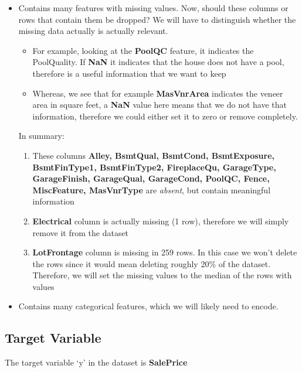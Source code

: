 \documentclass[11pt]{article}
\providecommand{\tightlist}{%
      \setlength{\itemsep}{0pt}\setlength{\parskip}{0pt}}
\begin{document}
\begin{itemize}
\tightlist
\item
  Contains many features with missing values. Now, should these columns
  or rows that contain them be dropped? We will have to distinguish
  whether the missing data actually is actually relevant.

  \begin{itemize}
  \tightlist
  \item
    For example, looking at the \textbf{PoolQC} feature, it indicates
    the PoolQuality. If \textbf{NaN} it indicates that the house does
    not have a pool, therefore is a useful information that we want to
    keep
  \item
    Whereas, we see that for example \textbf{MasVnrArea} indicates the
    veneer area in square feet, a \textbf{NaN} value here means that we
    do not have that information, therefore we could either set it to
    zero or remove completely.
  \end{itemize}

  In summary:

  \begin{enumerate}
  \def\labelenumi{\arabic{enumi}.}
  \tightlist
  \item
    These columns \textbf{Alley, BsmtQual, BsmtCond, BsmtExposure,
    BsmtFinType1, BsmtFinType2, FireplaceQu, GarageType, GarageFinish,
    GarageQual, GarageCond, PoolQC, Fence, MiscFeature, MasVnrType} are
    \emph{absent}, but contain meaningful information
  \item
    \textbf{Electrical} column is actually missing (1 row), therefore we
    will simply remove it from the dataset
  \item
    \textbf{LotFrontage} column is missing in 259 rows. In this case we
    won't delete the rows since it would mean deleting roughly 20\% of
    the dataset. Therefore, we will set the missing values to the median
    of the rows with values
  \end{enumerate}
\item
  Contains many categorical features, which we will likely need to
  encode.
\end{itemize}

    \subsection{Target Variable}\label{target-variable}

    The target variable `y' in the dataset is \textbf{SalePrice}
\end{document}
